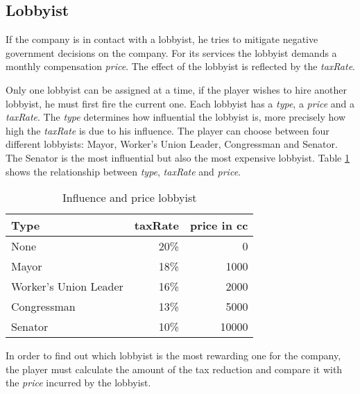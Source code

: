 \subsection{Lobbyist} \label{lobbyist_simulation}

If the company is in contact with a lobbyist, he tries to mitigate negative government decisions on the company. For its services the lobbyist demands a monthly compensation \textit{price}. The effect of the lobbyist is reflected by the \textit{taxRate}. 

Only one lobbyist can be assigned at a time, if the player wishes to hire another lobbyist, he must first fire the current one. Each lobbyist has a \textit{type}, a \textit{price} and a \textit{taxRate}. The \textit{type} determines how influential the lobbyist is, more precisely how high the \textit{taxRate} is due to his influence. The player can choose between four different lobbyists: Mayor, Worker’s Union Leader, Congressman and Senator. The Senator is the most influential but also the most expensive lobbyist. Table \ref{influence_lobbyist} shows the relationship between \textit{type}, \textit{taxRate} and \textit{price}. 

\begin{table}[ht]
\centering
\begin{tabular}{|l|r|r|}
\hline
\textbf{Type}  & \textbf{taxRate}   & \textbf{price in cc} \\ \hline
None                    & 20\%      & 0 \\
Mayor                   & 18\%      & 1000     \\
Worker's Union Leader   & 16\%      & 2000     \\
Congressman             & 13\%      & 5000     \\
Senator                 & 10\%      & 10000     \\
\hline
\end{tabular}
\caption{Influence and price lobbyist}
\label{influence_lobbyist}
\end{table}

In order to find out which lobbyist is the most rewarding one for the company, the player must calculate the amount of the tax reduction and compare it with the \textit{price} incurred by the lobbyist.
 



 




